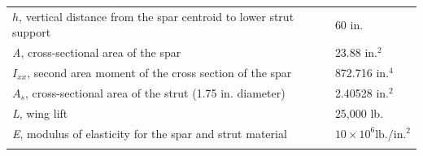 \documentclass{AeroStructure-ERJohnson}
\begin{document}
\begin{exercise}
\begin{table}[!h]%
{\tabcolsep=10pt\begin{tabular}{@{}ll@{}}\toprule
$h$, vertical distance from the spar centroid to lower strut support & 60 in.\\
\textit{A}, cross-sectional area of the spar & 23.88 in.$^2$\\
$I_{xx}$, second area moment of the cross section of the spar & 872.716 in.$^4$\\
$A_s$, cross-sectional area of the strut (1.75 in. diameter) & 2.40528 in.$^2$\\
\textit{L}, wing lift & 25,000 lb.\\
\textit{E}, modulus of elasticity for the spar and strut material & $10 \times 10^{6} \mathrm{lb}.{/}\text{in.}{}^{2}$\\\botrule
\end{tabular}}{}
\end{table}

\end{exercise}

\clearemptydoublepage
\end{document}
